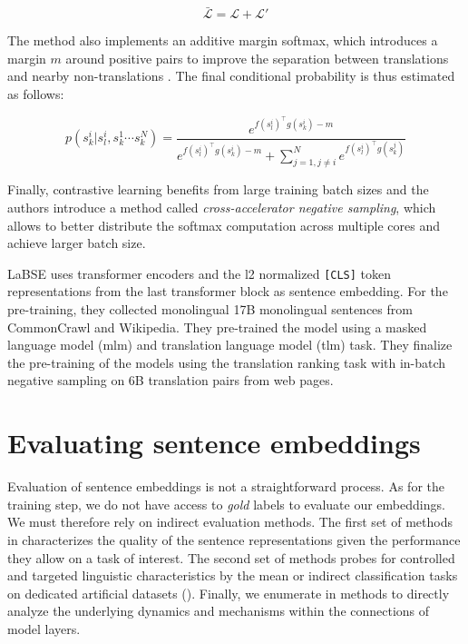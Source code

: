\begin{equation}
    \bar{\mathcal{L}} = \mathcal{L} + \mathcal{L}'
\label{eq:softmax_ams_combined}
\end{equation}

The method also implements an additive margin softmax, which introduces a margin $m$ around positive pairs to improve the separation between translations and nearby non-translations \parencite{yang_19}. The final conditional probability is thus estimated as follows:

\begin{equation*}
    p(s^i_k | s^i_l, s^1_k \cdots s^N_k) = \frac{e^{f(s^i_l)^{\top}g(s^i_k) -m}}{e^{f(s^i_l)^{\top}g(s^i_k)-m}+\sum_{j=1, j\neq i}^Ne^{f(s^i_l)^{\top}g(s^j_k)}}    
\end{equation*}

Finally, contrastive learning benefits from large training batch sizes \parencite{guo_18, chen_20a, qu_21} and the authors introduce a method called \textit{cross-accelerator negative sampling}, which allows to better distribute the softmax computation across multiple cores and achieve larger batch size.

LaBSE uses transformer encoders and the l2 normalized \texttt{[CLS]} token representations from the last transformer block as sentence embedding. For the pre-training, they collected monolingual 17B monolingual sentences from CommonCrawl and Wikipedia. They pre-trained the model using a masked language model (mlm) \parencite{devlin_19} and translation language model (tlm) \parencite{conneau_19} task. They finalize the pre-training of the models using  the translation ranking task with in-batch negative sampling on 6B translation pairs from web pages.

\section{Evaluating sentence embeddings}

Evaluation of sentence embeddings is not a straightforward process. As for the training step, we do not have access to \textit{gold} labels to evaluate our embeddings. We must therefore rely on indirect evaluation methods. The first set of methods in  characterizes the quality of the sentence representations given the performance they allow on a task of interest. The second set of methods probes for controlled and targeted linguistic characteristics by the mean or indirect classification tasks on dedicated artificial datasets (). Finally, we enumerate in  methods to directly analyze the underlying dynamics and mechanisms within the connections of model layers.

